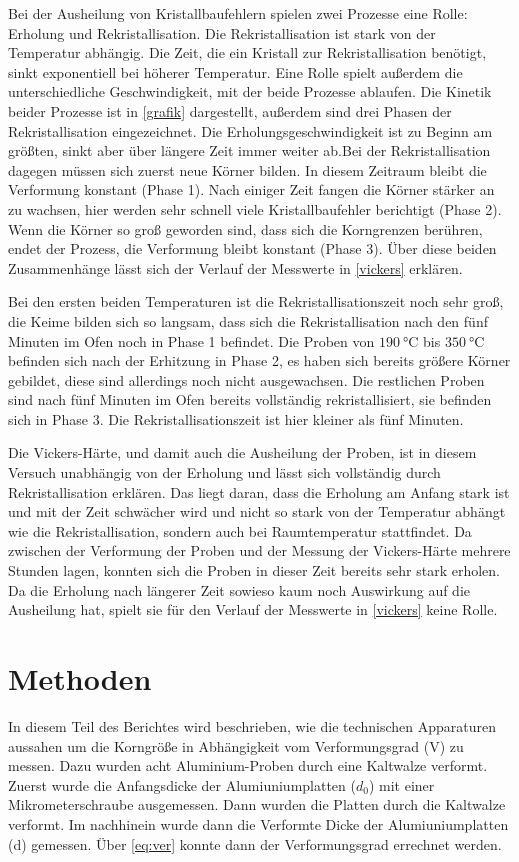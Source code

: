\documentclass[
	a4paper,
	12pt,
	pagesize,
	ngerman
]{scrartcl}
\begin{document}
Bei der Ausheilung von Kristallbaufehlern spielen zwei Prozesse eine Rolle: Erholung und Rekristallisation. Die Rekristallisation ist stark von der Temperatur abhängig. Die Zeit, die ein Kristall zur Rekristallisation benötigt, sinkt exponentiell bei höherer Temperatur. Eine Rolle spielt außerdem die unterschiedliche Geschwindigkeit, mit der beide Prozesse ablaufen. Die Kinetik beider Prozesse ist in \cref{grafik} dargestellt, außerdem sind drei Phasen der Rekristallisation eingezeichnet. Die Erholungsgeschwindigkeit ist zu Beginn am größten, sinkt aber über längere Zeit immer weiter ab.Bei der Rekristallisation dagegen müssen sich zuerst neue Körner bilden. In diesem Zeitraum bleibt die Verformung konstant (Phase 1). Nach einiger Zeit fangen die Körner stärker an zu wachsen, hier werden sehr schnell viele Kristallbaufehler berichtigt (Phase 2). Wenn die Körner so groß geworden sind, dass sich die Korngrenzen berühren, endet der Prozess, die Verformung bleibt konstant (Phase 3). Über diese beiden Zusammenhänge lässt sich der Verlauf der Messwerte in \cref{vickers} erklären.

Bei den ersten beiden Temperaturen ist die Rekristallisationszeit noch sehr groß, die Keime bilden sich so langsam, dass sich die Rekristallisation nach den fünf Minuten im Ofen noch in Phase 1 befindet. Die Proben von $\SI{190}{\degreeCelsius}$ bis $\SI{350}{\degreeCelsius}$ befinden sich nach der Erhitzung in Phase 2, es haben sich bereits größere Körner gebildet, diese sind allerdings noch nicht ausgewachsen. Die restlichen Proben sind nach fünf Minuten im Ofen bereits vollständig rekristallisiert, sie befinden sich in Phase 3. Die Rekristallisationszeit ist hier kleiner als fünf Minuten.

Die Vickers-Härte, und damit auch die Ausheilung der Proben, ist in diesem Versuch unabhängig von der Erholung und lässt sich vollständig durch Rekristallisation erklären. Das liegt daran, dass die Erholung am Anfang stark ist und mit der Zeit schwächer wird und nicht so stark von der Temperatur abhängt wie die Rekristallisation, sondern auch bei Raumtemperatur stattfindet. Da zwischen der Verformung der Proben und der Messung der Vickers-Härte mehrere Stunden lagen, konnten sich die Proben in dieser Zeit bereits sehr stark erholen. Da die Erholung nach längerer Zeit sowieso kaum noch Auswirkung auf die Ausheilung hat, spielt sie für den Verlauf der Messwerte in \cref{vickers} keine Rolle.

\section{Methoden}
In diesem Teil des Berichtes wird beschrieben, wie die technischen Apparaturen aussahen um die Korngröße in Abhängigkeit vom Verformungsgrad (V) zu messen. Dazu wurden acht Aluminium-Proben durch eine Kaltwalze verformt. Zuerst wurde die Anfangsdicke der Alumiuniumplatten ($d_0$) mit einer Mikrometerschraube ausgemessen. Dann wurden die Platten durch die Kaltwalze verformt. Im nachhinein wurde dann die Verformte Dicke der Alumiuniumplatten (d) gemessen. Über \cref{eq:ver} konnte dann der Verformungsgrad errechnet werden.
\end{document}
